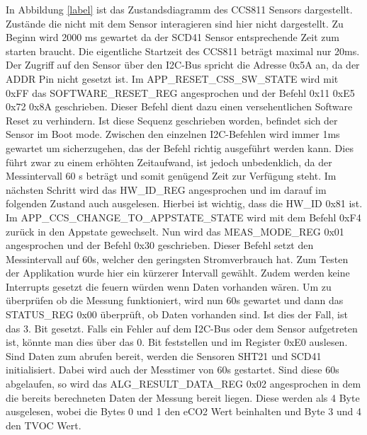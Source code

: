 \documentclass[]{article}
\begin{document}
			In Abbildung \ref{label} ist das Zustandsdiagramm des CCS811 Sensors dargestellt. Zustände die nicht mit dem Sensor interagieren sind hier nicht dargestellt. Zu Beginn wird 2000 ms gewartet da der SCD41 Sensor entsprechende Zeit zum starten braucht. Die eigentliche Startzeit des CCS811 beträgt maximal nur 20ms. Der Zugriff auf den Sensor über den I2C-Bus spricht die Adresse 0x5A an, da der ADDR Pin nicht gesetzt ist. Im APP\_RESET\_CSS\_SW\_STATE wird mit 0xFF das SOFTWARE\_RESET\_REG angesprochen und der Befehl 0x11 0xE5 0x72 0x8A geschrieben. Dieser Befehl dient dazu einen versehentlichen Software Reset zu verhindern. Ist diese Sequenz geschrieben worden, befindet sich der Sensor im Boot mode. Zwischen den einzelnen I2C-Befehlen wird immer 1ms gewartet um sicherzugehen, das der Befehl richtig ausgeführt werden kann. Dies führt zwar zu einem erhöhten Zeitaufwand, ist jedoch unbedenklich, da der Messintervall 60 s beträgt und somit genügend Zeit zur Verfügung steht. Im nächsten Schritt wird das HW\_ID\_REG angesprochen und im darauf im folgenden Zustand auch ausgelesen. Hierbei ist wichtig, dass die HW\_ID 0x81 ist. Im APP\_CCS\_CHANGE\_TO\_APPSTATE\_STATE wird mit dem Befehl 0xF4 zurück in den Appstate gewechselt. Nun wird das MEAS\_MODE\_REG 0x01 angesprochen und der Befehl 0x30 geschrieben. Dieser Befehl setzt den Messintervall auf 60s, welcher den geringsten Stromverbrauch hat. Zum Testen der Applikation wurde hier ein kürzerer Intervall gewählt. Zudem werden keine Interrupts gesetzt die feuern würden wenn Daten vorhanden wären. Um zu überprüfen ob die Messung funktioniert, wird nun 60s gewartet und dann das STATUS\_REG 0x00 überprüft, ob Daten vorhanden sind. Ist dies der Fall, ist das 3. Bit gesetzt. Falls ein Fehler auf dem I2C-Bus oder dem Sensor aufgetreten ist, könnte man dies über das 0. Bit feststellen und im Register 0xE0 auslesen. Sind Daten zum abrufen bereit, werden die Sensoren SHT21 und SCD41 initialisiert. Dabei wird auch der Messtimer von 60s gestartet. Sind diese 60s abgelaufen, so wird das ALG\_RESULT\_DATA\_REG 0x02 angesprochen in dem die bereits berechneten Daten der Messung bereit liegen. Diese werden als 4 Byte ausgelesen, wobei die Bytes 0 und 1 den eCO2 Wert beinhalten und Byte 3 und 4 den TVOC Wert.
\end{document}
